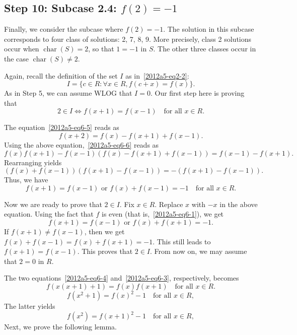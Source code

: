 \documentclass{article}
\DeclareMathOperator{\rchar}{char}
\begin{document}
\subsection*{Step 10: Subcase 2.4: $f(2) = -1$}

Finally, we consider the subcase where $f(2) = -1$.
The solution in this subcase corresponds to four class of solutions: 2, 7, 8, 9.
More precisely, class 2 solutions occur when $\rchar(S) = 2$, so that $1 = -1$ in $S$.
The other three classes occur in the case $\rchar(S) \neq 2$.

Again, recall the definition of the set $I$ as in~\eqref{2012a5-eq2-2}:
\[ I = \{c \in R : \forall x \in R, f(c + x) = f(x)\}. \]
As in Step 5, we can assume WLOG that $I = 0$.
Our first step here is proving that
\[ 2 \in I \iff f(x + 1) = f(x - 1) \quad \text{for all } x \in R. \]

The equation~\eqref{2012a5-eq6-5} reads as
\[ f(x + 2) = f(x) - f(x + 1) + f(x - 1). \]
Using the above equation,~\eqref{2012a5-eq6-6} reads as
\[ f(x) f(x + 1) - f(x - 1) (f(x) - f(x + 1) + f(x - 1)) = f(x - 1) - f(x + 1). \]
Rearranging yields
\[ (f(x) + f(x - 1))(f(x + 1) - f(x - 1)) = -(f(x + 1) - f(x - 1)). \]
Thus, we have
\[ f(x + 1) = f(x - 1) \text{ or } f(x) + f(x - 1) = -1 \quad \text{for all } x \in R. \]

Now we are ready to prove that $2 \in I$.
Fix $x \in R$.
Replace $x$ with $-x$ in the above equation.
Using the fact that $f$ is even (that is,~\eqref{2012a5-eq6-1}), we get
\[ f(x + 1) = f(x - 1) \text{ or } f(x) + f(x + 1) = -1. \]
If $f(x + 1) \neq f(x - 1)$, then we get $f(x) + f(x - 1) = f(x) + f(x + 1) = -1$.
This still leads to $f(x + 1) = f(x - 1)$.
This proves that $2 \in I$.
From now on, we may assume that $2 = 0$ in $R$.

The two equations~\eqref{2012a5-eq6-4} and~\eqref{2012a5-eq6-3}, respectively, becomes
\[ f(x(x + 1) + 1) = f(x) f(x + 1) \quad \text{for all } x \in R. \tag{10.1}\label{2012a5-eq10-1} \]
\[ f(x^2 + 1) = f(x)^2 - 1 \quad \text{for all } x \in R, \tag{10.2}\label{2012a5-eq10-2} \]
The latter yields
\[ f(x^2) = f(x + 1)^2 - 1  \quad \text{for all } x \in R, \tag{10.3}\label{2012a5-eq10-3} \]
Next, we prove the following lemma.
\end{document}

